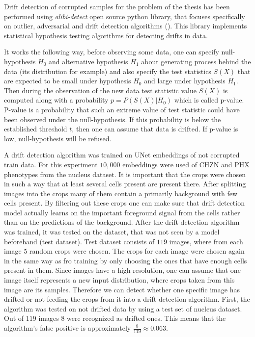 Drift detection of corrupted samples for the problem of the thesis has been performed using \textit{alibi-detect} open source python library, that focuses specifically on outlier, adversarial and drift detection algorithms (\cite{alibi-detect}). This library implements statistical hypothesis testing algorithms for detecting drifts in data. 

It works the following way, before observing some data, one can specify null-hypothesis $H_0$ and alternative hypothesis $H_1$ about generating process behind the data (its distribution for example) and also specify the test statistics $S(X)$ that are expected to be small under hypothesis $H_0$ and large under hypothesis $H_1$. Then during the observation of the new data test statistic value $S(X)$ is computed along with a probability $p = P(S(X)|H_0)$ which is called p-value. P-value is a probability that such an extreme value of test statistic could have been observed under the null-hypothesis. If this probability is below the established threshold $t$, then one can assume that data is drifted. If p-value is low, null-hypothesis will be refused. 

A drift detection algorithm was trained on UNet embeddings of not corrupted train data. For this experiment $10,000$ embeddings were used of CHZN and PHX phenotypes from the nucleus dataset. It is important that the crops were chosen in such a way that at least several cells present are present there. After splitting images into the crops many of them contain a primarily background with few cells present. By filtering out these crops one can make sure that drift detection model actually learns on the important foreground signal from the cells rather than on the predictions of the background. After the drift detection algorithm was trained, it was tested on the dataset, that was not seen by a model beforehand (test dataset). Test dataset consists of $119$ images, where from each image $5$ random crops were chosen. The crops for each image were chosen again in the same way as fro training by only choosing the ones that have enough cells present in them. Since images have a high resolution, one can assume that one image itself represents a new input distribution, where crops taken from this image are its samples. Therefore we can detect whether one specific image has drifted or not feeding the crops from it into a drift detection algorithm. First, the algorithm was tested on not drifted data by using a test set of nucleus dataset. Out of $119$ images $8$ were recognized as drifted ones. This means that the algorithm's false positive is approximately $\frac{8}{119} \approx 0.063$.

